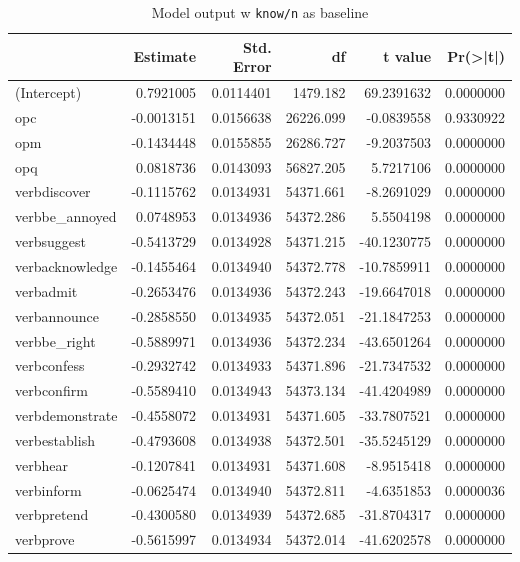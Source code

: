 \documentclass[12pt, a4paper]{article}
\begin{document}
\begin{table}[ht]
	\caption{Model output w \texttt{know/n} as baseline}
	\label{tab:discover-n}
	\centering

	\begin{tabular}{lrrrrr}
		\toprule
		  & Estimate & Std. Error & df & t value & Pr(>|t|)\\
		\midrule
		(Intercept) & 0.7921005 & 0.0114401 & 1479.182 & 69.2391632 & 0.0000000\\
		opc & -0.0013151 & 0.0156638 & 26226.099 & -0.0839558 & 0.9330922\\
		opm & -0.1434448 & 0.0155855 & 26286.727 & -9.2037503 & 0.0000000\\
		opq & 0.0818736 & 0.0143093 & 56827.205 & 5.7217106 & 0.0000000\\
		verbdiscover & -0.1115762 & 0.0134931 & 54371.661 & -8.2691029 & 0.0000000\\
		\addlinespace
		verbbe\_annoyed & 0.0748953 & 0.0134936 & 54372.286 & 5.5504198 & 0.0000000\\
		verbsuggest & -0.5413729 & 0.0134928 & 54371.215 & -40.1230775 & 0.0000000\\
		verbacknowledge & -0.1455464 & 0.0134940 & 54372.778 & -10.7859911 & 0.0000000\\
		verbadmit & -0.2653476 & 0.0134936 & 54372.243 & -19.6647018 & 0.0000000\\
		verbannounce & -0.2858550 & 0.0134935 & 54372.051 & -21.1847253 & 0.0000000\\
		\addlinespace
		verbbe\_right & -0.5889971 & 0.0134936 & 54372.234 & -43.6501264 & 0.0000000\\
		verbconfess & -0.2932742 & 0.0134933 & 54371.896 & -21.7347532 & 0.0000000\\
		verbconfirm & -0.5589410 & 0.0134943 & 54373.134 & -41.4204989 & 0.0000000\\
		verbdemonstrate & -0.4558072 & 0.0134931 & 54371.605 & -33.7807521 & 0.0000000\\
		verbestablish & -0.4793608 & 0.0134938 & 54372.501 & -35.5245129 & 0.0000000\\
		\addlinespace
		verbhear & -0.1207841 & 0.0134931 & 54371.608 & -8.9515418 & 0.0000000\\
		verbinform & -0.0625474 & 0.0134940 & 54372.811 & -4.6351853 & 0.0000036\\
		verbpretend & -0.4300580 & 0.0134939 & 54372.685 & -31.8704317 & 0.0000000\\
		verbprove & -0.5615997 & 0.0134934 & 54372.014 & -41.6202578 & 0.0000000\\

\end{tabular}
\end{table}
\end{document}
